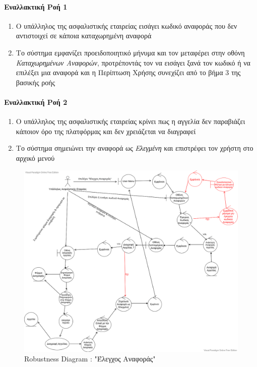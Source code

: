 \documentclass{../ol-softwaremanual}
\begin{document}
	\paragraph{Εναλλακτική Ροή 1}
	\begin{enumerate}
		\item Ο υπάλληλος της ασφαλιστικής εταιρείας εισάγει κωδικό αναφοράς που δεν αντιστοιχεί σε κάποια καταχωρημένη αναφορά
		\item Το σύστημα εμφανίζει προειδοποιητικό μήνυμα και τον μεταφέρει στην οθόνη \textit{Καταχωρημένων Αναφορών}, προτρέποντάς τον να εισάγει ξανά τον κωδικό ή να επιλέξει μια αναφορά και η Περίπτωση Χρήσης συνεχίζει από το βήμα 3 της βασικής ροής
	\end{enumerate}	
	
	\paragraph{Εναλλακτική Ροή 2}
	\begin{enumerate}
		\item Ο υπάλληλος της ασφαλιστικής εταιρείας κρίνει πως η αγγελία δεν παραβιάζει κάποιον όρο της πλατφόρμας και δεν χρειάζεται να διαγραφεί
		\item Το σύστημα σημειώνει την αναφορά ως \textit{Ελεγμένη}	και επιστρέφει τον χρήστη στο αρχικό μενού
	\end{enumerate}
	
	\begin{figure}[htbp!]
		\includegraphics[scale=0.395]{img/rob_check_report.png}
		\caption{\en Robustness Diagram : "\gr Έλεγχος Αναφοράς\en"\gr}
	\end{figure}
	
\end{document}
